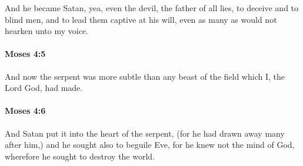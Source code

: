 			And he became Satan, yea, even the devil, the father of all lies, to deceive and to blind men, and to lead them captive at his will, even as many as would not hearken unto my voice.


		\paragraph{Moses 4:5} %
			\label{MOSES-4-5}

			And now the serpent was more subtle than any beast of the field which I, the Lord God, had made.


		\paragraph{Moses 4:6} %
			\label{MOSES-4-6}

			And Satan put it into the heart of the serpent, (for he had drawn away many after him,) and he sought also to beguile Eve, for he knew not the mind of God, wherefore he sought to destroy the world.


